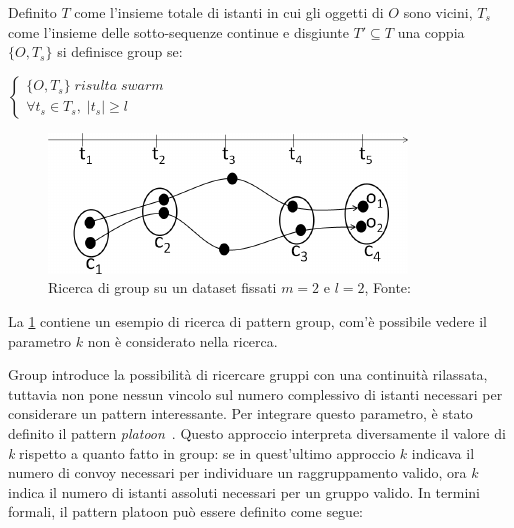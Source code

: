 \begin{definition}[Group]\label{definition:group}
  Definito \(T\) come l'insieme totale di istanti in cui gli oggetti di \(O\) sono vicini,
  \(T_s\) come l'insieme delle sotto-sequenze continue e disgiunte \(T' \subseteq T\)
  una coppia \( \{ O, T_{s} \} \) si definisce group se:
  \begin{center}
    \(
      \begin{cases}
         \{ O, T_{s} \} \; risulta \; swarm   \\
      \forall t_{s} \in T_{s}, \; |t_{s}| \geq l
      \end{cases}
    \)

  \end{center}
\end{definition}

\begin{figure}
  \centering
  \includegraphics[width=\textwidth]{res/fig/sec-2/Group.pdf}
  \caption{Ricerca di group su un dataset fissati \(m=2\) e \(l=2\), Fonte:\cite{DBLP:journals/ijitdm/PhanPT16}}%
  \label{fig:chap-1:GroupExample}
\end{figure}

La \cref{fig:chap-1:GroupExample} contiene un esempio di ricerca di pattern group, com'è possibile vedere il parametro \(k\) non è considerato nella ricerca.

Group introduce la possibilità di ricercare gruppi con una continuità rilassata, tuttavia
non pone nessun vincolo sul numero complessivo di istanti necessari per considerare un pattern interessante.
Per integrare questo parametro, è stato definito il pattern \textit{platoon}~\cite{li2015efficient}.
Questo approccio interpreta diversamente il valore di \textit{k} rispetto a quanto fatto in
group: se in quest'ultimo approccio \(k\) indicava il numero di convoy necessari per individuare
un raggruppamento valido, ora \(k\) indica il numero di istanti assoluti necessari per
un gruppo valido.
In termini formali, il pattern platoon può essere definito come segue:

